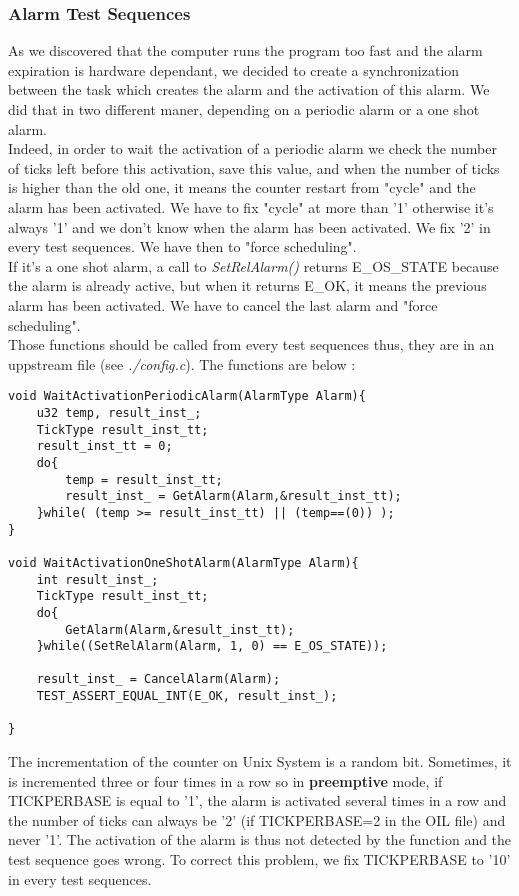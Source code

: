 \documentclass[10pt]{article}
\begin{document}
	\subsubsection{Alarm Test Sequences}
	As we discovered that the computer runs the program too fast and the alarm expiration is hardware dependant, we decided to create a synchronization between the task which creates the alarm and the activation of this alarm. We did that in two different maner, depending on a periodic alarm or a one shot alarm. \\
Indeed, in order to wait the activation of a periodic alarm we check the number of ticks left before this activation, save this value, and when the number of ticks is higher than the old one, it means the counter restart from "cycle" and the alarm has been activated. We have to fix "cycle" at more than '1' otherwise it's always '1' and we don't know when the alarm has been activated. We fix '2' in every test sequences. We have then to "force scheduling".\\
If it's a one shot alarm, a call to \textit{SetRelAlarm()} returns E\_OS\_STATE because the alarm is already active, but when it returns E\_OK, it means the previous alarm has been activated. We have to cancel the last alarm and "force scheduling".\\
Those functions should be called from every test sequences thus, they are in an uppstream file (see \textit{./config.c}). The functions are below :

\begin{lstlisting}
void WaitActivationPeriodicAlarm(AlarmType Alarm){
	u32 temp, result_inst_;
	TickType result_inst_tt;
	result_inst_tt = 0;		
	do{
		temp = result_inst_tt;
		result_inst_ = GetAlarm(Alarm,&result_inst_tt);
	}while( (temp >= result_inst_tt) || (temp==(0)) );	
}

void WaitActivationOneShotAlarm(AlarmType Alarm){
	int result_inst_;
	TickType result_inst_tt;
	do{
		GetAlarm(Alarm,&result_inst_tt);
	}while((SetRelAlarm(Alarm, 1, 0) == E_OS_STATE));
	
	result_inst_ = CancelAlarm(Alarm);
	TEST_ASSERT_EQUAL_INT(E_OK, result_inst_);
	
}
\end{lstlisting}

The incrementation of the counter on Unix System is a random bit. Sometimes, it is incremented three or four times in a row so in \textbf{preemptive} mode, if TICKPERBASE is equal to '1', the alarm is activated several times in a row and the number of ticks can always be '2' (if TICKPERBASE=2 in the OIL file) and never '1'. The activation of the alarm is thus not detected by the function and the test sequence goes wrong. To correct this problem, we fix TICKPERBASE to '10' in every test sequences.
		
\end{document}
